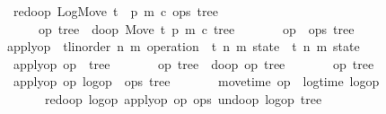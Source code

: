 \documentclass[10pt,journal,compsoc]{IEEEtran}
\renewcommand{\isacartoucheopen}{}
\renewcommand{\isacartoucheclose}{}
\begin{document}
\begin{figure}
\begin{isabellebody}
\ \ {\isacartoucheopen}redo{\isacharunderscore}op\ {\isacharparenleft}{\rm LogMove}\ t\ {\isacharunderscore}\ p\ m\ c{\isacharparenright}\ {\isacharparenleft}ops{\isacharcomma}\ tree{\isacharparenright}\ {\isacharequal}\isanewline
\ \ \ \ \ {\isacharparenleft}\ {\isacharparenleft}op{}{\isacharcomma}\ tree{}{\isacharparenright}\ {\isacharequal}\ do{\isacharunderscore}op\ {\isacharparenleft}{\rm Move}\ t\ p\ m\ c{\isacharcomma}\ tree{\isacharparenright}\isanewline
\ \ \ \ \ \ \ {\isacharparenleft}op{}\ {\isacharhash}\ ops{\isacharcomma}\ tree{}{\isacharparenright}{\isacharparenright}{\isacartoucheclose}\isanewline
\isanewline
{}\isamarkupfalse%
\ apply{\isacharunderscore}op\ {\isacharcolon}{\isacharcolon}\ {\isacartoucheopen}{\isacharparenleft}{\isacharprime}t{\isacharcolon}{\isacharcolon}{\isacharbraceleft}linorder{\isacharbraceright}{\isacharcomma}\ {\isacharprime}n{\isacharcomma}\ {\isacharprime}m{\isacharparenright}\ operation\ {\isasymRightarrow}\ {\isacharparenleft}{\isacharprime}t{\isacharcomma}\ {\isacharprime}n{\isacharcomma}\ {\isacharprime}m{\isacharparenright}\ state\ {\isasymRightarrow}\ {\isacharparenleft}{\isacharprime}t{\isacharcomma}\ {\isacharprime}n{\isacharcomma}\ {\isacharprime}m{\isacharparenright}\ state{\isacartoucheclose}\ \isanewline
\ \ {\isacartoucheopen}apply{\isacharunderscore}op\ op{}\ {\isacharparenleft}{\isacharbrackleft}{\isacharbrackright}{\isacharcomma}\ tree{}{\isacharparenright}\ {\isacharequal}\isanewline
\ \ \ \ \ {\isacharparenleft}\ {\isacharparenleft}op{}{\isacharcomma}\ tree{}{\isacharparenright}\ {\isacharequal}\ do{\isacharunderscore}op\ {\isacharparenleft}op{}{\isacharcomma}\ tree{}{\isacharparenright}\isanewline
\ \ \ \ \ \ \ {\isacharparenleft}{\isacharbrackleft}op{}{\isacharbrackright}{\isacharcomma}\ tree{}{\isacharparenright}{\isacharparenright}{\isacartoucheclose}\ {\isacharbar}\isanewline
\ \ {\isacartoucheopen}apply{\isacharunderscore}op\ op{}\ {\isacharparenleft}logop\ {\isacharhash}\ ops{\isacharcomma}\ tree{}{\isacharparenright}\ {\isacharequal}\isanewline
\ \ \ \ \ {\isacharparenleft}\ move{\isacharunderscore}time\ op{}\ {\isacharless}\ log{\isacharunderscore}time\ logop\isanewline
\ \ \ \ \ \ \ redo{\isacharunderscore}op\ logop\ {\isacharparenleft}apply{\isacharunderscore}op\ op{}\ {\isacharparenleft}ops{\isacharcomma}\ undo{\isacharunderscore}op\ {\isacharparenleft}logop{\isacharcomma}\ tree{}{\isacharparenright}{\isacharparenright}{\isacharparenright}\isanewline

\end{isabellebody}
\end{figure}
\end{document}
